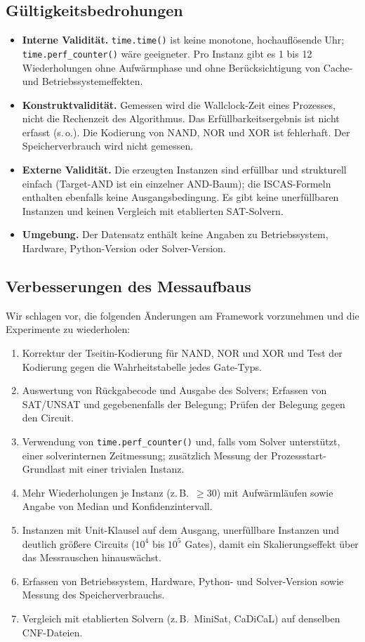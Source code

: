 \documentclass[a4paper,12pt]{article}
\theoremstyle{definition}
\begin{document}
\subsection{Gültigkeitsbedrohungen}

\begin{itemize}
	\item \textbf{Interne Validität.} \texttt{time.time()} ist keine monotone, hochauflösende Uhr; \texttt{time.perf\_counter()} wäre geeigneter. Pro Instanz gibt es 1 bis 12 Wiederholungen ohne Aufwärmphase und ohne Berücksichtigung von Cache- und Betriebssystemeffekten.
	\item \textbf{Konstruktvalidität.} Gemessen wird die Wallclock-Zeit eines Prozesses, nicht die Rechenzeit des Algorithmus. Das Erfüllbarkeitsergebnis ist nicht erfasst (s.\,o.). Die Kodierung von NAND, NOR und XOR ist fehlerhaft. Der Speicherverbrauch wird nicht gemessen.
	\item \textbf{Externe Validität.} Die erzeugten Instanzen sind erfüllbar und strukturell einfach (Target-AND ist ein einzelner AND-Baum); die ISCAS-Formeln enthalten ebenfalls keine Ausgangsbedingung. Es gibt keine unerfüllbaren Instanzen und keinen Vergleich mit etablierten SAT-Solvern.
	\item \textbf{Umgebung.} Der Datensatz enthält keine Angaben zu Betriebssystem, Hardware, Python-Version oder Solver-Version.
\end{itemize}

\subsection{Verbesserungen des Messaufbaus}

Wir schlagen vor, die folgenden Änderungen am Framework vorzunehmen und die Experimente zu wiederholen:
\begin{enumerate}
	\item Korrektur der Tseitin-Kodierung für NAND, NOR und XOR und Test der Kodierung gegen die Wahrheitstabelle jedes Gate-Typs.
	\item Auswertung von Rückgabecode und Ausgabe des Solvers; Erfassen von SAT/UNSAT und gegebenenfalls der Belegung; Prüfen der Belegung gegen den Circuit.
	\item Verwendung von \texttt{time.perf\_counter()} und, falls vom Solver unterstützt, einer solverinternen Zeitmessung; zusätzlich Messung der Prozessstart-Grundlast mit einer trivialen Instanz.
	\item Mehr Wiederholungen je Instanz (z.\,B.\ $\ge 30$) mit Aufwärmläufen sowie Angabe von Median und Konfidenzintervall.
	\item Instanzen mit Unit-Klausel auf dem Ausgang, unerfüllbare Instanzen und deutlich größere Circuits ($10^4$ bis $10^5$ Gates), damit ein Skalierungseffekt über das Messrauschen hinauswächst.
	\item Erfassen von Betriebssystem, Hardware, Python- und Solver-Version sowie Messung des Speicherverbrauchs.
	\item Vergleich mit etablierten Solvern (z.\,B.\ MiniSat, CaDiCaL) auf denselben CNF-Dateien.
\end{enumerate}
\end{document}
